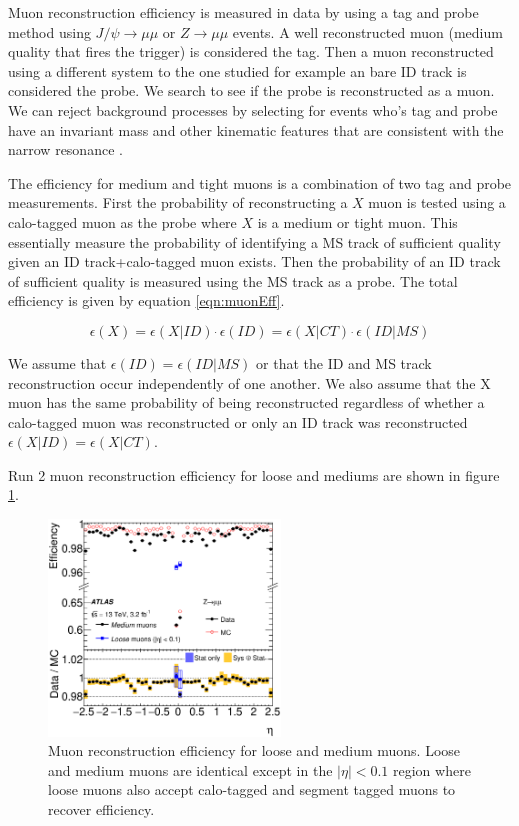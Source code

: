 \indent Muon reconstruction efficiency is measured in data by using a tag and probe method using $J/\psi\rightarrow \mu\mu$ or $Z\rightarrow\mu\mu$ events.  A well reconstructed muon (medium quality that fires the trigger) is considered the tag.  Then a muon reconstructed using a different system to the one studied for example an bare ID track is considered the probe.  We search to see if the probe is reconstructed as a muon.  We can reject background processes by selecting for events who's tag and probe have an invariant mass and other kinematic features that are consistent with the narrow resonance .  

\indent The efficiency for medium and tight muons is a combination of two tag and probe measurements.  First the probability of reconstructing a $X$ muon is tested using a calo-tagged muon as the probe where $X$ is a medium or tight muon.  This essentially measure the probability of identifying a MS track of sufficient quality given an ID track+calo-tagged muon exists.  Then the probability of an ID track of sufficient quality is measured using the MS track as a probe.  The total efficiency is given by equation \ref{eqn:muonEff}.

\begin{equation}
\epsilon (X) = \epsilon (X | ID)~\dot~\epsilon(ID) = \epsilon(X | CT)~\dot~\epsilon(ID|MS)
\label{eqn:muonEff}
\end{equation}

\indent We assume that $\epsilon(ID) = \epsilon(ID|MS)$ or that the ID and MS track reconstruction occur independently of one another.  We also assume that the X muon has the same probability of being reconstructed regardless of whether a calo-tagged muon was reconstructed or only an ID track was reconstructed $\epsilon (X | ID) = \epsilon(X | CT)$.

\indent Run 2 muon reconstruction efficiency for loose and mediums are shown in figure \ref{fig:muoneff}.

\begin{figure}[htb]
  \begin{center}
    \includegraphics[width=0.55\textwidth]{figures/MuonReco/MuonEff.eps}\hspace{0.05\textwidth}
\end{center}
\caption{Muon reconstruction efficiency for loose and medium muons.\cite{MuonReco}  Loose and medium muons are identical except in the $|\eta| < 0.1$ region where loose muons also accept calo-tagged and segment tagged muons to recover efficiency.}
\label{fig:muoneff} 
\end{figure}

